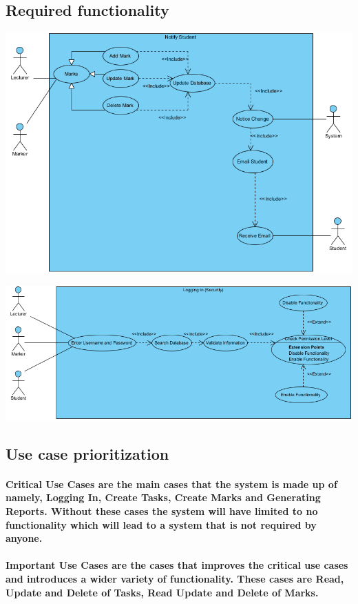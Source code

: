 \documentclass[12pt]{article}
\begin{document}
  \subsection{Required functionality}  
  \begin{center}
  \includegraphics[width=150mm]{UseCaseDiagram2.png}  
  \end{center}
  \begin{center}
  \includegraphics[width=150mm]{UseCaseDiagram3.png}  
  \end{center}
 \subsection{Use case prioritization}
 \paragraph*{Critical Use Cases are the main cases that the system is made up of namely, Logging In, Create Tasks, Create Marks and Generating Reports. Without these cases the system will have limited to no functionality which will lead to a system that is not required by anyone.}
 \paragraph*{Important Use Cases are the cases that improves the critical use cases and introduces a wider variety of functionality. These cases are Read, Update and Delete of Tasks, Read Update  and Delete of Marks.}
\end{document}
